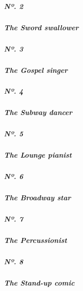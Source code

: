 \href{https://www.nytimes3xbfgragh.onion/interactive/2019/05/30/magazine/sword-swallowing-new-york.html}{}

\hypertarget{nuxba-2}{%
\subparagraph{Nº. 2}\label{nuxba-2}}

\hypertarget{the-sword-swallower}{%
\subparagraph{The Sword swallower}\label{the-sword-swallower}}

\href{https://www.nytimes3xbfgragh.onion/interactive/2019/05/30/magazine/gospel-singer-new-york.html}{}

\hypertarget{nuxba-3}{%
\subparagraph{Nº. 3}\label{nuxba-3}}

\hypertarget{the-gospel-singer}{%
\subparagraph{The Gospel singer}\label{the-gospel-singer}}

\href{https://www.nytimes3xbfgragh.onion/interactive/2019/05/30/magazine/subway-dance-new-york.html}{}

\hypertarget{nuxba-4}{%
\subparagraph{Nº. 4}\label{nuxba-4}}

\hypertarget{the-subway-dancer}{%
\subparagraph{The Subway dancer}\label{the-subway-dancer}}

\href{https://www.nytimes3xbfgragh.onion/interactive/2019/05/30/magazine/earl-rose-piano-carlyle-new-york.html}{}

\hypertarget{nuxba-5}{%
\subparagraph{Nº. 5}\label{nuxba-5}}

\hypertarget{the-lounge-pianist}{%
\subparagraph{The Lounge pianist}\label{the-lounge-pianist}}

\href{https://www.nytimes3xbfgragh.onion/interactive/2019/05/30/magazine/broadway-kiss-me-kate.html}{}

\hypertarget{nuxba-6}{%
\subparagraph{Nº. 6}\label{nuxba-6}}

\hypertarget{the-broadway-star}{%
\subparagraph{The Broadway star}\label{the-broadway-star}}

\href{https://www.nytimes3xbfgragh.onion/interactive/2019/05/30/magazine/latin-beat-new-york.html}{}

\hypertarget{nuxba-7}{%
\subparagraph{Nº. 7}\label{nuxba-7}}

\hypertarget{the-percussionist}{%
\subparagraph{The Percussionist}\label{the-percussionist}}

\href{https://www.nytimes3xbfgragh.onion/interactive/2019/05/30/magazine/female-comedy-new-york.html}{}

\hypertarget{nuxba-8}{%
\subparagraph{Nº. 8}\label{nuxba-8}}

\hypertarget{the-stand-up-comic}{%
\subparagraph{The Stand-up comic}\label{the-stand-up-comic}}

